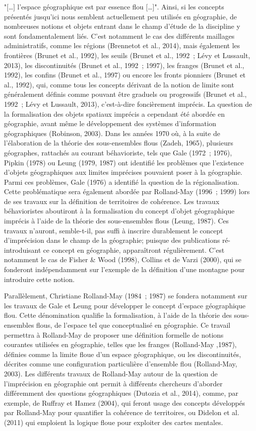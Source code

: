 "[…] l’espace géographique est par essence flou […]".  Ainsi, si les
concepts présentés jusqu’ici nous semblent actuellement peu utilisés
en géographie, de nombreuses notions et objets entrant dans le champ
d’étude de la discipline y sont fondamentalement liés. C’est notamment
le cas des différents maillages administratifs, comme les régions
(Brennetot et al., 2014), mais également les frontières (Brunet et
al., 1992), les seuils (Brunet et al., 1992 ; Lévy et Lussault, 2013),
les discontinuités (Brunet et al., 1992 ; 1997), les franges (Brunet
et al., 1992), les confins (Brunet et al., 1997) ou encore les fronts
pionniers (Brunet et al., 1992), qui, comme tous les concepts dérivant
de la notion de limite sont généralement définis comme pouvant être
graduels ou progressifs (Brunet et al., 1992 ; Lévy et Lussault,
2013), c’est-à-dire foncièrement imprécis.  La question de la
formalisation des objets spatiaux imprécis a cependant été abordée en
géographie, avant même le développement des systèmes d’information
géographiques (Robinson, 2003). Dans les années 1970 où, à la suite de
l’élaboration de la théorie des sous-ensembles flous (Zadeh, 1965),
plusieurs géographes, rattachés au courant béhavioriste, tels que Gale
(1972 ; 1976), Pipkin (1978) ou Leung (1979, 1987) ont identifié les
problèmes que l’existence d’objets géographiques aux limites
imprécises pouvaient poser à la géographie. Parmi ces problèmes, Gale
(1976) a identifié la question de la régionalisation. Cette
problématique sera également abordée par Rolland-May (1996 ; 1999)
lors de ses travaux sur la définition de territoires de cohérence. Les
travaux béhavioristes aboutiront à la formalisation du concept d’objet
géographique imprécis à l’aide de la théorie des sous-ensembles flous
(Leung, 1987). Ces travaux n’auront, semble-t-il, pas suffi à inscrire
durablement le concept d’imprécision dans le champ de la géographie;
puisque des publications ré-introduisant ce concept en géographie,
apparaîtront régulièrement. C’est notamment le cas de Fisher \& Wood
(1998), Collins et de Varzi (2000), qui se fonderont indépendamment
sur l’exemple de la définition d’une montagne pour introduire cette
notion.

Parallèlement, Christiane Rolland-May (1984 ; 1987) se
fondera notamment sur les travaux de Gale et Leung pour développer le
concept d’espace géographique flou. Cette dénomination qualifie la
formalisation, à l’aide de la théorie des sous-ensembles flous, de
l’espace tel que conceptualisé en géographie. Ce travail permettra à
Rolland-May de proposer une définition formelle de notions courantes
utilisées en géographie, telles que les franges (Rolland-May ,1987),
définies comme la limite floue d’un espace géographique, ou les
discontinuités, décrites comme une configuration particulière
d’ensemble flou (Rolland-May, 2003). Les différents travaux de
Rolland-May autour de la question de l’imprécision en géographie ont
permit à différents chercheurs d’aborder différemment des questions
géographiques (Dutozia et al., 2014), comme, par exemple, de Ruffray
et Hamez (2004), qui feront usage des concepts développés par
Rolland-May pour quantifier la cohérence de territoires, ou Didelon et
al. (2011) qui emploient la logique floue pour exploiter des cartes
mentales.

